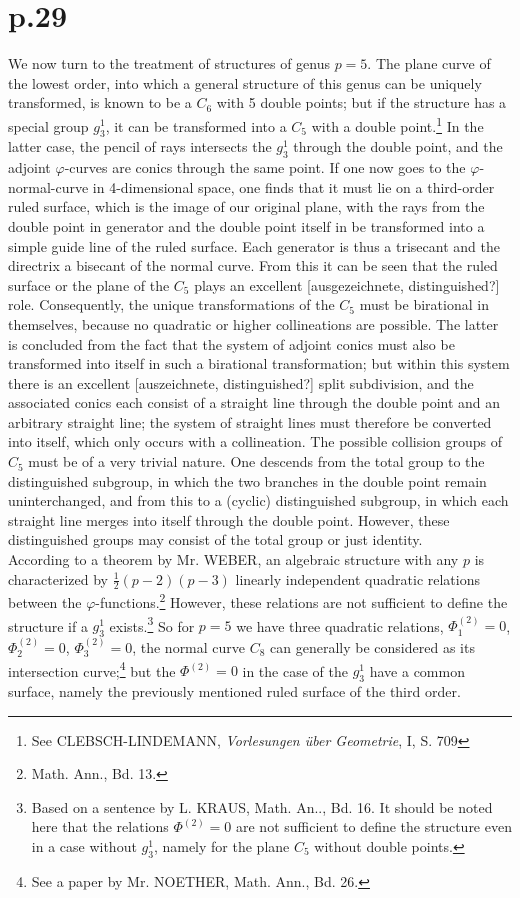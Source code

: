 \documentclass[leqno]{article}
\begin{document}
\section{p.29}
We now turn to the treatment of structures of genus $p=5$. The plane curve of the lowest order, into which a general structure of this genus can be uniquely transformed, is known to be a $C_6$ with 5 double points; but if the structure has a special group $g_3^1$, it can be transformed into a $C_5$ with a double point.\footnote{See CLEBSCH-LINDEMANN, \textit{Vorlesungen \"uber Geometrie}, I, S. 709} In the latter case, the pencil of rays intersects the $g_3^1$ through the double point, and the adjoint $\varphi$-curves are conics through the same point. If one now goes to the $\varphi$-normal-curve in 4-dimensional space, one finds that it must lie on a third-order ruled surface, which is the image of our original plane, with the rays from the double point in generator and the double point itself in be transformed into a simple guide line of the ruled surface. Each generator is thus a trisecant and the directrix a bisecant of the normal curve. From this it can be seen that the ruled surface or the plane of the $C_5$ plays an excellent [ausgezeichnete, distinguished?] role. Consequently, the unique transformations of the $C_5$ must be birational in themselves, because no quadratic or higher collineations are possible. The latter is concluded from the fact that the system of adjoint conics must also be transformed into itself in such a birational transformation; but within this system there is an excellent [auszeichnete, distinguished?] split subdivision, and the associated conics each consist of a straight line through the double point and an arbitrary straight line; the system of straight lines must therefore be converted into itself, which only occurs with a collineation. The possible collision groups of $C_5$ must be of a very trivial nature. One descends from the total group to the distinguished subgroup, in which the two branches in the double point remain uninterchanged, and from this to a (cyclic) distinguished subgroup, in which each straight line merges into itself through the double point. However, these distinguished groups may consist of the total group or just identity. \\
According to a theorem by Mr. WEBER, an algebraic structure with any $p$ is characterized by $\frac{1}{2}(p-2)(p-3)$ linearly independent quadratic relations between the $\varphi$-functions.\footnote{Math. Ann., Bd. 13.} However, these relations are not sufficient to define the structure if a $g_3^1$ exists.\footnote{Based on a sentence by L. KRAUS, Math. An.., Bd. 16. It should be noted here that the relations $\Phi^{(2)}=0$ are not sufficient to define the structure even in a case without $g_3^1$, namely for the plane $C_5$ without double points.} So for $p=5$ we have three quadratic relations, $\Phi_1^{(2)}=0$, $\Phi_2^{(2)}=0$, $\Phi_3^{(2)}=0 $, the normal curve $C_8$ can generally be considered as its intersection curve;\footnote{See a paper by Mr. NOETHER, Math. Ann., Bd. 26.} but the $\Phi^{(2)}=0$ in the case of the $g_3^1$ have a common surface, namely the previously mentioned ruled surface of the third order.
\end{document}
